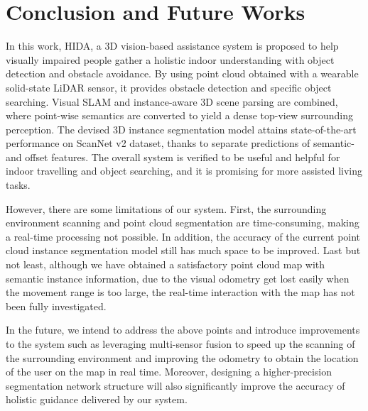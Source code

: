 \documentclass[10pt,twocolumn,letterpaper]{article}
\begin{document}
\section{Conclusion and Future Works}

In this work, HIDA, a 3D vision-based assistance system is proposed to help visually impaired people gather a holistic indoor understanding with object detection and obstacle avoidance. By using point cloud obtained with a wearable solid-state LiDAR sensor, it provides obstacle detection and specific object searching. Visual SLAM and instance-aware 3D scene parsing are combined, where point-wise semantics are converted to yield a dense top-view surrounding perception. The devised 3D instance segmentation model attains state-of-the-art performance on ScanNet v2 dataset, thanks to separate predictions of semantic- and offset features. The overall system is verified to be useful and helpful for indoor travelling and object searching, and it is promising for more assisted living tasks.

However, there are some limitations of our system. First, the surrounding environment scanning and point cloud segmentation are time-consuming, making a real-time processing not possible. In addition, the accuracy of the current point cloud instance segmentation model still has much space to be improved. Last but not least, although we have obtained a satisfactory point cloud map with semantic instance information, due to the visual odometry get lost easily when the movement range is too large, the real-time interaction with the map has not been fully investigated.
 
In the future, we intend to address the above points and introduce improvements to the system such as leveraging multi-sensor fusion to speed up the scanning of the surrounding environment and improving the odometry to obtain the location of the user on the map in real time. Moreover, designing a higher-precision segmentation network structure will also significantly improve the accuracy of holistic guidance delivered by our system.


\clearpage

{\small


}
\end{document}
